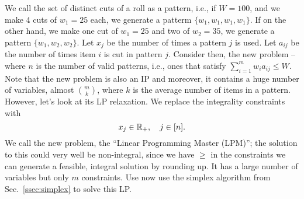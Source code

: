 \documentclass[letterpaper, 10pt, twocolumn, reqno]{amsart}
\begin{document}
We call the set of distinct cuts of a roll as a pattern, i.e., if $W=100$, and we make 4 cuts of $w_1 = 25$ each, we generate a patterm $\{ w_1, w_1, w_1, w_1 \}$. If on the other hand, we make one cut of $w_1 =25$ and two of $w_2 = 35$, we generate a pattern $\{ w_1, w_2, w_2 \}$. Let $x_j$ be the number of times a pattern $j$ is used. Let $a_{ij}$ be the number of times item $i$ is cut in pattern $j$. Consider then, the new problem --
where $n$ is the number of valid patterns, i.e., ones that satisfy $\sum_{i=1}^m w_i a_{ij} \leq W$. Note that the new problem is also an IP and moreover, it contains a huge number of variables, almost $m \choose k$, where $k$ is the average number of items in a pattern. However, let's look at its LP relaxation. We replace the integrality constraints with
$$
x_j \in \mathbb{R}_+,\quad j \in [n].
$$
We call the new problem, the ``Linear Programming Master (LPM)''; the solution to this could very well be non-integral, since we have $\geq$ in the constraints we can generate a feasible, integral solution by rounding up. It has a large number of variables but only $m$ constraints. Use now use the simplex algorithm from Sec.~\ref{ssec:simplex} to solve this LP.
\end{document}
